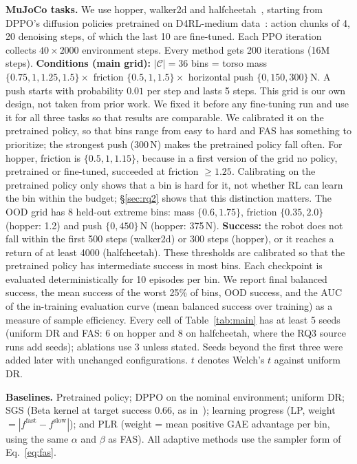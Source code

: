 \documentclass{article}
\newcommand{\fas}{\textsc{FAS}}
\newcommand{\C}{\mathcal{C}}
\begin{document}
\textbf{MuJoCo tasks.} We use hopper, walker2d and halfcheetah~\citep{todorov2012mujoco}, starting from DPPO's diffusion policies pretrained on D4RL-medium data~\citep{fu2020d4rl}: action chunks of 4, 20 denoising steps, of which the last 10 are fine-tuned.
Each PPO iteration collects $40 \times 2000$ environment steps. Every method gets 200 iterations (16M steps).
\textbf{Conditions (main grid):} $|\C| = 36$ bins = torso mass $\{0.75, 1, 1.25, 1.5\}\times$ friction $\{0.5, 1, 1.5\}\times$ horizontal push $\{0, 150, 300\}$\,N. A push starts with probability $0.01$ per step and lasts 5 steps.
This grid is our own design, not taken from prior work. We fixed it before any fine-tuning run and use it for all three tasks so that results are comparable. We calibrated it on the pretrained policy, so that bins range from easy to hard and \fas{} has something to prioritize; the strongest push (300\,N) makes the pretrained policy fall often.
For hopper, friction is $\{0.5, 1, 1.15\}$, because in a first version of the grid no policy, pretrained or fine-tuned, succeeded at friction $\geq 1.25$.
Calibrating on the pretrained policy only shows that a bin is hard for it, not whether RL can learn the bin within the budget; \S\ref{sec:rq2} shows that this distinction matters.
The OOD grid has 8 held-out extreme bins: mass $\{0.6, 1.75\}$, friction $\{0.35, 2.0\}$ (hopper: 1.2) and push $\{0, 450\}$\,N (hopper: 375\,N).
\textbf{Success:} the robot does not fall within the first 500 steps (walker2d) or 300 steps (hopper), or it reaches a return of at least 4000 (halfcheetah). These thresholds are calibrated so that the pretrained policy has intermediate success in most bins.
Each checkpoint is evaluated deterministically for 10 episodes per bin.
We report final balanced success, the mean success of the worst 25\% of bins, OOD success, and the AUC of the in-training evaluation curve (mean balanced success over training) as a measure of sample efficiency.
Every cell of Table~\ref{tab:main} has at least 5 seeds (uniform DR and \fas{}: 6 on hopper and 8 on halfcheetah, where the RQ3 source runs add seeds); ablations use 3 unless stated. Seeds beyond the first three were added later with unchanged configurations. $t$ denotes Welch's $t$ against uniform DR.

\textbf{Baselines.} Pretrained policy; DPPO on the nominal environment; uniform DR; SGS (Beta kernel at target success 0.66, as in~\citep{zhang2026sgs}); learning progress (LP, weight $=|f^{\text{fast}}-f^{\text{slow}}|$); and PLR (weight = mean positive GAE advantage per bin, using the same $\alpha$ and $\beta$ as \fas{}). All adaptive methods use the sampler form of Eq.~\eqref{eq:fas}.
\end{document}
